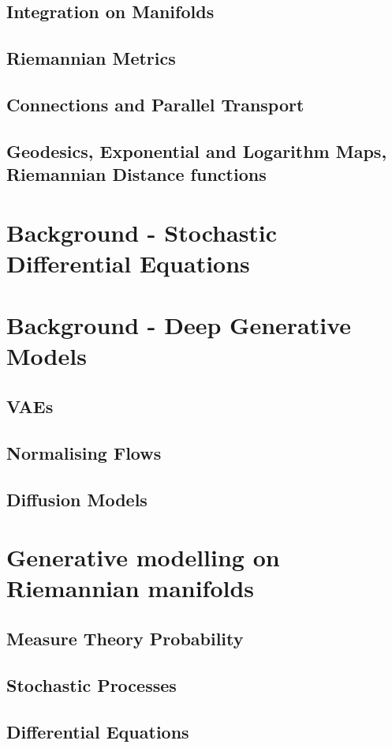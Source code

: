 \documentclass[10pt]{book}
\begin{document}
\section{Integration on Manifolds}
\section{Riemannian Metrics}
\section{Connections and Parallel Transport}
\section{Geodesics, Exponential and Logarithm Maps, Riemannian Distance functions}
\chapter{Background - Stochastic Differential Equations}
\chapter{Background - Deep Generative Models}
\section{VAEs}
\section{Normalising Flows}
\section{Diffusion Models}

\chapter{Generative modelling on Riemannian manifolds}
\section{Measure Theory Probability}
\section{Stochastic Processes}
\section{Differential Equations}
\end{document}
